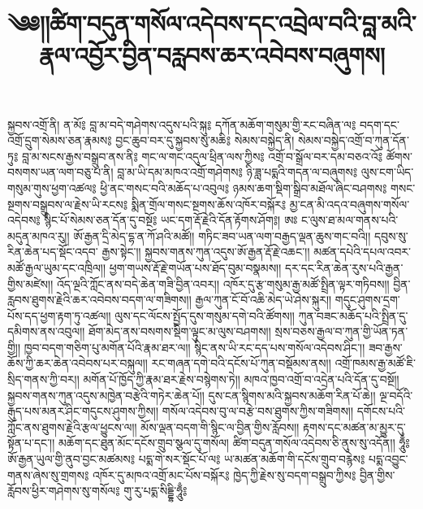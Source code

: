 

\raggedright
\title{\Large ༄༅།།ཚིག་བདུན་གསོལ་འདེབས་དང་འབྲེལ་བའི་བླ་མའི་རྣལ་འབྱོར་བྱིན་བརླབས་ཆར་འབེབས་བཞུགས།}
\maketitle
{སྐྱབས་འགྲོ་ནི།}
{
  \Large
  ན་མོ༔ བླ་མ་བདེ་གཤེགས་འདུས་པའི་སྐུ༔
  དཀོན་མཆོག་གསུམ་གྱི་རང་བཞིན་ལ༔
  བདག་དང་འགྲོ་དྲུག་སེམས་ཅན་རྣམས༔
  བྱང་ཆུབ་བར་དུ་སྐྱབས་སུ་མཆི༔
}
{སེམས་བསྐྱེད་ནི།}
{
  \Large
  སེམས་བསྐྱེད་འགྲོ་བ་ཀུན་དོན་ཏུ༔
  བླ་མ་སངས་རྒྱས་བསྒྲུབ་ནས་ནི༔
  གང་ལ་གང་འདུལ་ཕྲིན་ལས་ཀྱིས༔
  འགྲོ་བ་སྒྲོལ་བར་དམ་བཅའ་འོ༔
}
{ཚོགས་བསགས་ཡན་ལག་བཅུ་པ་ནི།}
{
  \Large
  བླ་མ་ཡི་དམ་མཁའ་འགྲོ་གཤེགས༔
  ཉི་ཟླ་པདྨའི་གདན་ལ་བཞུགས༔
  ལུས་ངག་ཡིད་གསུམ་གུས་ཕྱག་འཚལ༔
  ཕྱི་ནང་གསང་བའི་མཆོད་པ་འབུལ༔
  ཉམས་ཆག་སྡིག་སྒྲིབ་མཐོལ་ཞིང་བཤགས༔
  གསང་སྔགས་བསྒྲུབས་ལ་རྗེས་ཡི་རངས༔
  སྨིན་གྲོལ་གསང་སྔགས་ཆོས་འཁོར་བསྐོར༔
  མྱ་ངན་མི་འདའ་བཞུགས་གསོལ་འདེབས༔
  སྙིང་པོ་སེམས་ཅན་དོན་དུ་བསྔོ༔
  ཡང་དག་རྡོ་རྗེའི་དོན་རྟོགས་ཤོག༔།
}
{
  \Large
  ཨཿ ང་ལུས་ཐ་མལ་གནས་པའི་མདུན་མཁའ་རུ།།
  ཨོ་རྒྱན་དྲི་མེད་དྷ་ན་ཀོ་ཤའི་མཚོ།།
  གཏིང་ཟབ་ཡན་ལག་བརྒྱད་ལྡན་ཆུས་གང་བའི།།
  དབུས་སུ་རིན་ཆེན་པད་སྡོང་འདབ་ རྒྱས་སྟེང་།།
  སྐྱབས་གནས་ཀུན་འདུས་ཨོ་རྒྱན་རྡོ་རྗེ་འཆང་།།
  མཚན་དཔེའི་དཔལ་འབར་མཚོ་རྒྱལ་ཡུམ་དང་འཁྲིལ།།
  ཕྱག་གཡས་རྡོ་རྗེ་གཡོན་པས་ཐོད་བུམ་བསྣམས།།
  དར་དང་རིན་ཆེན་རུས་པའི་རྒྱན་གྱིས་མཛེས།།
  འོད་ལྔའི་ཀློང་ནས་བདེ་ཆེན་གཟི་བྱིན་འབར།།
  འཁོར་དུ་རྩ་གསུམ་རྒྱ་མཚོ་སྤྲིན་ལྟར་གཏིབས།།
  བྱིན་རླབས་ཐུགས་རྗེའི་ཆར་འབེབས་བདག་ལ་གཟིགས།།
  རྒྱལ་ཀུན་ངོ་བོ་འཆི་མེད་ཡེ་ཤེས་སྐུར།།
  གདུང་ཤུགས་དྲག་པོས་དད་ཕྱག་རྟག་ཏུ་འཚལ།།
  ལུས་དང་ལོངས་སྤྱོད་དུས་གསུམ་དགེ་བའི་ཚོགས།།
  ཀུན་བཟང་མཆོད་པའི་སྤྲིན་དུ་དམིགས་ནས་འབུལ།།
  ཐོག་མེད་ནས་བསགས་སྡིག་ལྟུང་མ་ལུས་བཤགས།།
  སྲས་བཅས་རྒྱལ་བ་ཀུན་གྱི་ཡོན་ཏན་གྱི།།
  ཁྱབ་བདག་གཅིག་པུ་མགོན་པོའི་རྣམ་ཐར་ལ།།
  སྙིང་ནས་ཡི་རང་དད་པས་གསོལ་འདེབས་ཤིང་།།
  ཟབ་རྒྱས་ཆོས་ཀྱི་ཆར་ཆེན་འབེབས་པར་བསྐུལ།།
  རང་གཞན་དགེ་བའི་དངོས་པོ་ཀུན་བསྡོམས་ནས།།
  འགྲོ་ཁམས་རྒྱ་མཚོ་ཇི་སྲིད་གནས་ཀྱི་བར།།
  མགོན་པོ་ཁྱོད་ཀྱི་རྣམ་ཐར་རྗེས་བསྙེགས་ཏེ།།
  མཁའ་ཁྱབ་འགྲོ་བ་འདྲེན་པའི་དོན་དུ་བསྔོ།།
  སྐྱབས་གནས་ཀུན་འདུས་མཁྱེན་བརྩེའི་གཏེར་ཆེན་པོ།།
  དུས་ངན་སྙིགས་མའི་སྐྱབས་མཆོག་རིན་པོ་ཆེ།།
  ལྔ་བདོའི་རྒུད་པས་མནར་ཤིང་གདུངས་ཤུགས་ཀྱིས།།
  གསོལ་འདེབས་བུ་ལ་བརྩེ་བས་ཐུགས་ཀྱིས་གཟིགས།།
  དགོངས་པའི་ཀློང་ནས་ཐུགས་རྗེའི་རྩལ་ཕྱུངས་ལ།།
  མོས་ལྡན་བདག་གི་སྙིང་ལ་བྱིན་གྱིས་རློབས།།
  རྟགས་དང་མཚན་མ་མྱུར་དུ་སྟོན་པ་དང་།།
  མཆོག་དང་ཐུན་མོང་དངོས་གྲུབ་སྩལ་དུ་གསོལ།
}
{ཚིག་བདུན་གསོལ་འདེབས་ཅི་ནུས་སུ་འདོན།།}
{
  \Large
  ཧཱུྃ༔ ཨོ་རྒྱན་ཡུལ་གྱི་ནུབ་བྱང་མཚམས༔
  པདྨ་གེ་སར་སྡོང་པོ་ལ༔
  ཡ་མཚན་མཆོག་གི་དངོས་གྲུབ་བརྙེས༔
  པདྨ་འབྱུང་གནས་ཞེས་སུ་གྲགས༔
  འཁོར་དུ་མཁའ་འགྲོ་མང་པོས་བསྐོར༔
  ཁྱེད་ཀྱི་རྗེས་སུ་བདག་བསྒྲུབ་ཀྱིས༔
  བྱིན་གྱིས་རློབས་ཕྱིར་གཤེགས་སུ་གསོལ༔
  གུ་རུ་པདྨ་སིདྡྷི་ཧཱུྃ༔
}
